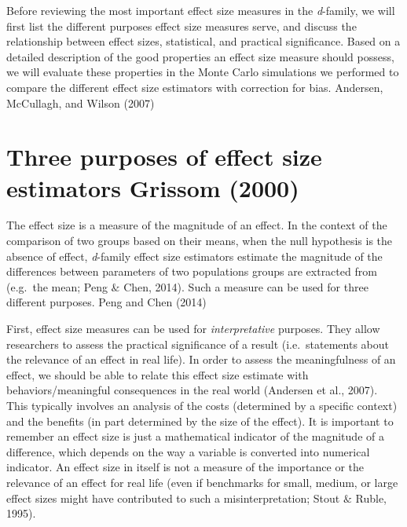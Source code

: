 \documentclass[
  english,
  man,floatsintext]{apa6}
\begin{document}
Before reviewing the most important effect size measures in the \emph{d}-family, we will first list the different purposes effect size measures serve, and discuss the relationship between effect sizes, statistical, and practical significance. Based on a detailed description of the good properties an effect size measure should possess, we will evaluate these properties in the Monte Carlo simulations we performed to compare the different effect size estimators with correction for bias. \color{white} Andersen, McCullagh, and Wilson (2007) \color{black}

\hypertarget{three-purposes-of-effect-size-estimators-grissom_heterogeneity_2000}{%
\section{\texorpdfstring{Three purposes of effect size estimators \color{white} Grissom (2000)}{Three purposes of effect size estimators  Grissom (2000)}}\label{three-purposes-of-effect-size-estimators-grissom_heterogeneity_2000}}

\color{black}The effect size is a measure of the magnitude of an effect. In the context of the comparison of two groups based on their means, when the null hypothesis is the absence of effect, \emph{d}-family effect size estimators estimate the magnitude of the differences between parameters of two populations groups are extracted from (e.g.~the mean; Peng \(\&\) Chen, 2014). Such a measure can be used for three different purposes. \color{white} Peng and Chen (2014)

\color{black}First, effect size measures can be used for \emph{interpretative} purposes. They allow researchers to assess the practical significance of a result (i.e.~statements about the relevance of an effect in real life). In order to assess the meaningfulness of an effect, we should be able to relate this effect size estimate with behaviors/meaningful consequences in the real world (Andersen et al., 2007). This typically involves an analysis of the costs (determined by a specific context) and the benefits (in part determined by the size of the effect). It is important to remember an effect size is just a mathematical indicator of the magnitude of a difference, which depends on the way a variable is converted into numerical indicator. An effect size in itself is not a measure of the importance or the relevance of an effect for real life (even if benchmarks for small, medium, or large effect sizes might have contributed to such a misinterpretation; Stout
\(\&\) Ruble, 1995).
\end{document}
